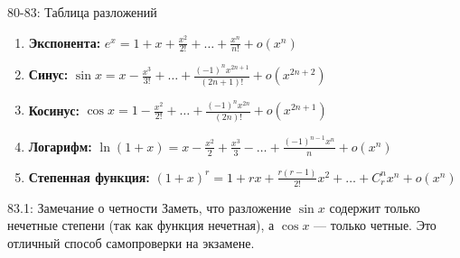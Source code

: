 \documentclass[a4paper,12pt]{article}
\begin{document}
	\begin{theorembox}{80-83: Таблица разложений}
		\begin{enumerate}
			\item \textbf{Экспонента:} $e^x = 1 + x + \frac{x^2}{2!} + \dots + \frac{x^n}{n!} + o(x^n)$
			\item \textbf{Синус:} $\sin x = x - \frac{x^3}{3!} + \dots + \frac{(-1)^n x^{2n+1}}{(2n+1)!} + o(x^{2n+2})$
			\item \textbf{Косинус:} $\cos x = 1 - \frac{x^2}{2!} + \dots + \frac{(-1)^n x^{2n}}{(2n)!} + o(x^{2n+1})$
			\item \textbf{Логарифм:} $\ln(1+x) = x - \frac{x^2}{2} + \frac{x^3}{3} - \dots + \frac{(-1)^{n-1} x^n}{n} + o(x^n)$
			\item \textbf{Степенная функция:} $(1+x)^r = 1 + rx + \frac{r(r-1)}{2!}x^2 + \dots + C_r^n x^n + o(x^n)$
		\end{enumerate}
	\end{theorembox}
	
	\begin{notebook}{83.1: Замечание о четности}
		Заметь, что разложение $\sin x$ содержит только нечетные степени (так как функция нечетная), а $\cos x$ — только четные. Это отличный способ самопроверки на экзамене.
	\end{notebook}
	
\end{document}
